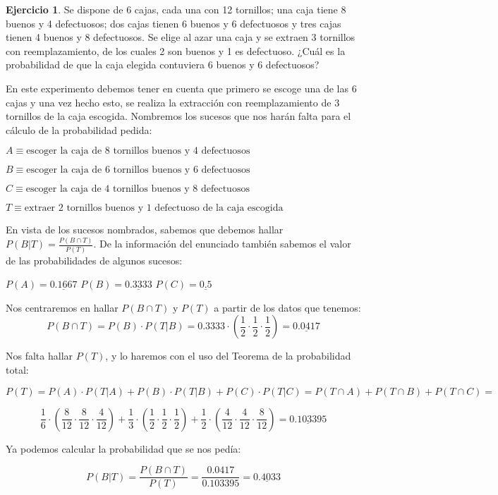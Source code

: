 \documentclass[a4paper, 12pt]{article}
\theoremstyle{definition}
\newtheorem{ej}{Ejercicio}
\begin{document}
\begin{ej}
Se dispone de 6 cajas, cada una con 12 tornillos; una caja tiene 8 buenos y 4 defectuosos; dos
cajas tienen 6 buenos y 6 defectuosos y tres cajas tienen 4 buenos y 8 defectuosos. Se elige al
azar una caja y se extraen 3 tornillos con reemplazamiento, de los cuales 2 son buenos y 1 es
defectuoso. ¿Cuál es la probabilidad de que la caja elegida contuviera 6 buenos y 6 defectuosos?

\medskip

En este experimento debemos tener en cuenta que primero se escoge una de las 6 cajas y una vez hecho esto, se realiza la extracción con reemplazamiento de 3 tornillos de la caja escogida. Nombremos los sucesos que nos harán falta para el cálculo de la probabilidad pedida:

\begin{center}
    $A \equiv \text{escoger la caja de 8 tornillos buenos y 4 defectuosos}$
    
    $B \equiv \text{escoger la caja de 6 tornillos buenos y 6 defectuosos}$
    
    $C \equiv \text{escoger la caja de 4 tornillos buenos y 8 defectuosos}$
    
    $T \equiv \text{extraer 2 tornillos buenos y 1 defectuoso de la caja escogida}$
\end{center}

En vista de los sucesos nombrados, sabemos que debemos hallar $P(B|T) = \frac{P(B \cap T)}{P(T)}$. De la información del enunciado también sabemos el valor de las probabilidades de algunos sucesos:

\begin{center}
    $P(A) = \underline{0.1667}$ \hspace{1cm} $P(B) = \underline{0.3333}$ \hspace{1cm} $P(C) = \underline{0.5}$
\end{center}

Nos centraremos en hallar $P(B \cap T)$ y $P(T)$ a partir de los datos que tenemos:
\[
    P(B \cap T) = P(B) \cdot P(T|B) = 0.3333 \cdot \left(\frac{1}{2} \cdot \dfrac{1}{2} \cdot \frac{1}{2} \right) = \underline{0.0417} 
\]

Nos falta hallar $P(T)$, y lo haremos con el uso del Teorema de la probabilidad total:

\begin{center}
    $P(T) = P(A) \cdot P(T|A) + P(B) \cdot P(T|B) + P(C) \cdot P(T|C) = P(T \cap A) + P(T \cap B) + P(T \cap C) = $
\end{center}

\[
    \frac{1}{6}\cdot \left(\frac{8}{12} \cdot \dfrac{8}{12} \cdot \frac{4}{12} \right) + \frac{1}{3} \cdot \left(\frac{1}{2} \cdot \dfrac{1}{2} \cdot \frac{1}{2} \right) + \frac{1}{2} \cdot \left(\frac{4}{12} \cdot \dfrac{4}{12} \cdot \frac{8}{12} \right) = \underline{0.103395}
\]

Ya podemos calcular la probabilidad que se nos pedía:

\[
    P(B|T) = \frac{P(B \cap T)}{P(T)} = \frac{0.0417}{0.103395} = \underline{0.4033}
\]
\end{ej}
\end{document}
